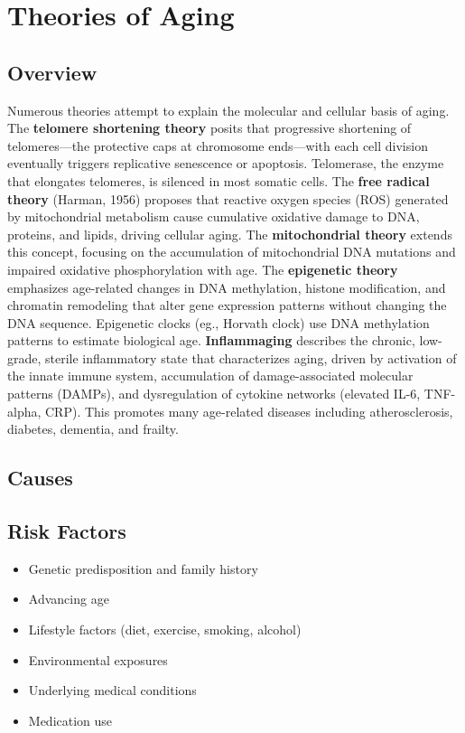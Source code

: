 \chapter{Theories of Aging}
\label{sec:Theories of Aging}

\section{Overview}
Numerous theories attempt to explain the molecular and cellular basis of aging. The \textbf{telomere shortening theory} posits that progressive shortening of telomeres---the protective caps at chromosome ends---with each cell division eventually triggers replicative senescence or apoptosis. Telomerase, the enzyme that elongates telomeres, is silenced in most somatic cells. The \textbf{free radical theory} (Harman, 1956) proposes that reactive oxygen species (ROS) generated by mitochondrial metabolism cause cumulative oxidative damage to DNA, proteins, and lipids, driving cellular aging. The \textbf{mitochondrial theory} extends this concept, focusing on the accumulation of mitochondrial DNA mutations and impaired oxidative phosphorylation with age. The \textbf{epigenetic theory} emphasizes age-related changes in DNA methylation, histone modification, and chromatin remodeling that alter gene expression patterns without changing the DNA sequence. Epigenetic clocks (eg., Horvath clock) use DNA methylation patterns to estimate biological age. \textbf{Inflammaging} describes the chronic, low-grade, sterile inflammatory state that characterizes aging, driven by activation of the innate immune system, accumulation of damage-associated molecular patterns (DAMPs), and dysregulation of cytokine networks (elevated IL-6, TNF-alpha, CRP). This promotes many age-related diseases including atherosclerosis, diabetes, dementia, and frailty.
\section{Causes}
\section{Risk Factors}

\begin{itemize}[noitemsep]
  \item Genetic predisposition and family history
  \item Advancing age
  \item Lifestyle factors (diet, exercise, smoking, alcohol)
  \item Environmental exposures
  \item Underlying medical conditions
  \item Medication use
\end{itemize}
